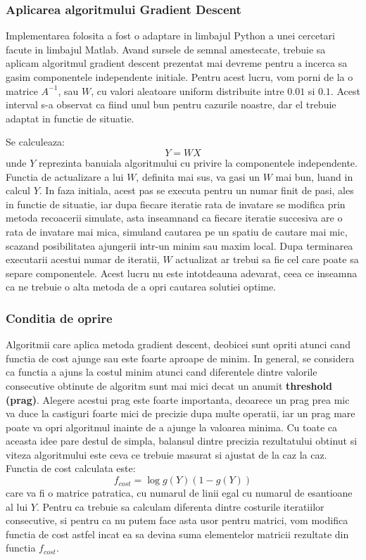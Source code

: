 \documentclass[12pt,oneside]{article}
\begin{document}
\subsubsection{Aplicarea algoritmului Gradient Descent}
Implementarea folosita a fost o adaptare in limbajul Python a unei cercetari facute in limbajul Matlab.\cite{vsubhashini} Avand sursele de semnal amestecate, trebuie sa aplicam algoritmul gradient descent prezentat mai devreme pentru a incerca sa gasim componentele independente initiale.  Pentru acest lucru, vom porni de la o matrice $A^{-1}$, sau $W$, cu valori aleatoare uniform distribuite intre $0.01$ si $0.1$. Acest interval s-a observat ca fiind unul bun pentru cazurile noastre, dar el trebuie adaptat in functie de situatie. 

Se calculeaza:
\begin{equation}
	Y=WX
\end{equation} 
unde $Y$ reprezinta banuiala algoritmului cu privire la componentele independente. Functia de actualizare a lui $W$, definita mai sus, va gasi un $W$ mai bun, luand in calcul $Y$. In faza initiala, acest pas se executa pentru un numar finit de pasi, ales in functie de situatie, iar dupa fiecare iteratie rata de invatare se modifica prin metoda recoacerii simulate, asta inseamnand ca fiecare iteratie succesiva are o rata de invatare mai mica, simuland cautarea pe un spatiu de cautare mai mic, scazand posibilitatea ajungerii intr-un minim sau maxim local. Dupa terminarea executarii acestui numar de iteratii, $W$ actualizat ar trebui sa fie cel care poate sa separe componentele. Acest lucru nu este intotdeauna adevarat, ceea ce inseamna ca ne trebuie o alta metoda de a opri cautarea solutiei optime.

\subsubsection{Conditia de oprire}
Algoritmii care aplica metoda gradient descent, deobicei sunt opriti atunci cand functia de cost ajunge sau este foarte aproape de minim. In general, se considera ca functia a ajuns la costul minim atunci cand diferentele dintre valorile consecutive obtinute de algoritm sunt mai mici decat un anumit \textbf{threshold (prag)}. Alegere acestui prag este foarte importanta, deoarece un prag prea mic va duce la castiguri foarte mici de precizie dupa multe operatii, iar un prag mare poate va opri algoritmul inainte de a ajunge la valoarea minima. Cu toate ca aceasta idee pare destul de simpla, balansul dintre precizia rezultatului obtinut si viteza algoritmului este ceva ce trebuie masurat si ajustat de la caz la caz. Functia de cost calculata este:
\begin{equation}
	f_{cost}=\log g(Y)(1-g(Y))
\end{equation}
care va fi o matrice patratica, cu numarul de linii egal cu numarul de esantioane al lui $Y$. Pentru ca trebuie sa calculam diferenta dintre costurile iteratiilor consecutive, si pentru ca nu putem face asta usor pentru matrici, vom modifica functia de cost astfel incat ea sa devina suma elementelor matricii rezultate din functia $f_{cost}$.
\end{document}

